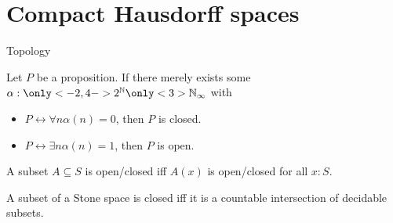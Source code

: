\documentclass{beamer}
\newtheorem{remark}{Remark}
\begin{document}
\section{Compact Hausdorff spaces} %
\begin{frame}{Topology}
  \begin{definition}
    Let $P$ be a proposition. If there merely exists some 
    $\alpha:\only<-2,4->{2^\mathbb N} \only<3>{\mathbb N_\infty}$ with 
    \begin{itemize}
      \item $P\leftrightarrow \forall n\alpha(n) = 0$, then $P$ is closed. 
        \pause
      \item $P\leftrightarrow \exists n\alpha(n) = 1$, then $P$ is open. 
        \pause
        \pause
    \end{itemize}
\end{definition}
  \pause
   \begin{definition}
     A subset $A\subseteq S$ is open/closed iff $A (x)$ is open/closed for all $x:S$. 
   \end{definition}
   \pause
  \begin{lemma}
    A subset of a Stone space is closed iff 
    it is a \alert<7->{countable} intersection of decidable subsets.
  \end{lemma}
\end{frame}
\end{document}
